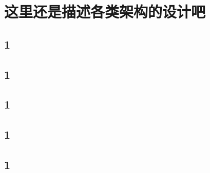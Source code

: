 \section{这里还是描述各类架构的设计吧}
\subsection{1}

\subsection{1}

\subsection{1}

\subsection{1}

\subsection{1}
